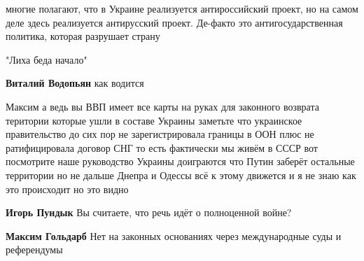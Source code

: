 \begin{itemize}

многие полагают, что в Украине реализуется антироссийский проект, но на самом
деле здесь реализуется антирусский проект. Де-факто это антигосударственная
политика, которая разрушает страну


"Лиха беда начало"

\begin{itemize}
 
\textbf{Виталий Водопьян} как водится
\end{itemize}


Максим а ведь вы ВВП имеет все карты на руках для законного возврата територии
которые ушли в составе Украины заметьте что украинское правительство до сих пор
не зарегистрировала границы в ООН плюс не ратифицировала договор СНГ то есть
фактически мы живём в СССР вот посмотрите наше руководство Украины доиграются
что Путин заберёт остальные территории но не дальше Днепра и Одессы всё к этому
движется и я не знаю как это происходит но это видно

\begin{itemize}
 
\textbf{Игорь Пундык} Вы считаете, что речь идёт о полноценной войне?

 
\textbf{Максим Гольдарб} Нет на законных основаниях через международные суды и референдумы


\end{itemize}
\end{itemize}
